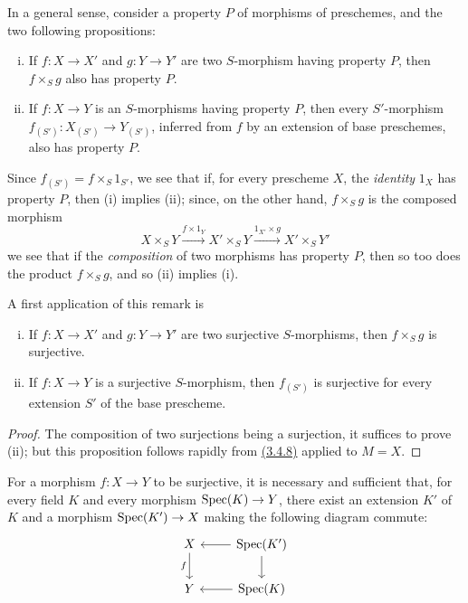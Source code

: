 \begin{env}[3.5.1]
\label{env-1.3.5.1}
In a general sense, consider a property $P$ of morphisms of preschemes, and the two following propositions:
\begin{enumerate}[(i)]
    \item If $f\colon X\to X'$ and $g\colon Y\to Y'$ are two $S$-morphism having property $P$, then $f\times_S g$ also has property $P$.
    \item If $f\colon X\to Y$ is an $S$-morphisms having property $P$, then every $S'$-morphism $f_{(S')}\colon X_{(S')}\to Y_{(S')}$, inferred from $f$ by an extension of base preschemes, also has property $P$.
\end{enumerate}

Since $f_{(S')}=f\times_S 1_{S'}$, we see that if, for every prescheme $X$, the \emph{identity} $1_X$ has property $P$, then (i) implies (ii); since, on the other hand, $f\times_S g$ is the composed morphism
\begin{equation*}
    X\times_S Y \xrightarrow{f\times1_Y} X'\times_S Y \xrightarrow{1_{X'}\times g} X'\times_S Y'
\end{equation*}
we see that if the \emph{composition} of two morphisms has property $P$, then so too does the product $f\times_S g$, and so (ii) implies (i).
\end{env}

A first application of this remark is
\begin{prop}[3.5.2]
\label{prop-1.3.5.2}
\begin{enumerate}[(i)]
    \item If $f\colon X\to X'$ and $g\colon Y\to Y'$ are two surjective $S$-morphisms, then $f\times_S g$ is surjective.
    \item If $f\colon X\to Y$ is a surjective $S$-morphism, then $f_{(S')}$ is surjective for every extension $S'$ of the base prescheme.
\end{enumerate}
\end{prop}

\begin{proof}
\label{proof-prop-1.3.5.2}
The composition of two surjections being a surjection, it suffices to prove (ii); but this proposition follows rapidly from \hyperref[cor-1.3.4.8]{(3.4.8)} applied to $M=X$.
\end{proof}

\begin{prop}[3.5.3]
\label{prop-1.3.5.3}
For a morphism $f\colon X\to Y$ to be surjective, it is necessary and sufficient that, for every field $K$ and every morphism ${\mathop{\mathrm{Spec}}\nolimits}(K)\to Y$, there exist an extension $K'$ of $K$ and a morphism ${\mathop{\mathrm{Spec}}\nolimits}(K')\to X$ making the following diagram commute:
\begin{equation*}
    \begin{tikzcd}
        X \ar[d, swap, "f"]
        & \Spec(K') \ar[l] \ar[d]\\
        Y
        & \Spec(K) \ar[l]
    \end{tikzcd}
\end{equation*}
\end{prop}

